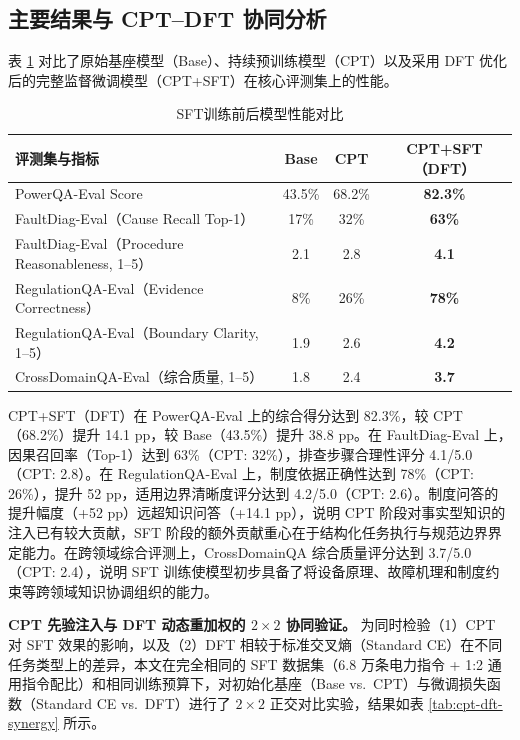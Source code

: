 \documentclass[fontset=fandol,type=master,campus=shenzhen,etitleauto=true]{hithesisbook}
\begin{document}
\subsection{主要结果与 CPT--DFT 协同分析}\label{ux4e3bux8981ux7ed3ux679c-2}

表 \ref{tab:sft-results} 对比了原始基座模型（Base）、持续预训练模型（CPT）以及采用 DFT 优化后的完整监督微调模型（CPT+SFT）在核心评测集上的性能。

\begin{table}[htbp]
\centering
\caption{SFT训练前后模型性能对比}
\label{tab:sft-results}
\small
\begin{tabular}{l c c c}
\toprule
\textbf{评测集与指标} & \textbf{Base} & \textbf{CPT} & \textbf{CPT+SFT（DFT）} \\
\midrule
PowerQA-Eval Score & 43.5\% & 68.2\% & \textbf{82.3\%} \\
FaultDiag-Eval（Cause Recall Top-1） & 17\% & 32\% & \textbf{63\%} \\
FaultDiag-Eval（Procedure Reasonableness, 1--5） & 2.1 & 2.8 & \textbf{4.1} \\
RegulationQA-Eval（Evidence Correctness） & 8\% & 26\% & \textbf{78\%} \\
RegulationQA-Eval（Boundary Clarity, 1--5） & 1.9 & 2.6 & \textbf{4.2} \\
CrossDomainQA-Eval（综合质量, 1--5） & 1.8 & 2.4 & \textbf{3.7} \\
\bottomrule
\end{tabular}
\end{table}

CPT+SFT（DFT）在 PowerQA-Eval 上的综合得分达到 82.3\%，较 CPT（68.2\%）提升 14.1 pp，较 Base（43.5\%）提升 38.8 pp。在 FaultDiag-Eval 上，因果召回率（Top-1）达到 63\%（CPT: 32\%），排查步骤合理性评分 4.1/5.0（CPT: 2.8）。在 RegulationQA-Eval 上，制度依据正确性达到 78\%（CPT: 26\%），提升 52 pp，适用边界清晰度评分达到 4.2/5.0（CPT: 2.6）。制度问答的提升幅度（+52 pp）远超知识问答（+14.1 pp），说明 CPT 阶段对事实型知识的注入已有较大贡献，SFT 阶段的额外贡献重心在于结构化任务执行与规范边界界定能力。在跨领域综合评测上，CrossDomainQA 综合质量评分达到 3.7/5.0（CPT: 2.4），说明 SFT 训练使模型初步具备了将设备原理、故障机理和制度约束等跨领域知识协调组织的能力。

\textbf{CPT 先验注入与 DFT 动态重加权的 $2 \times 2$ 协同验证。} 为同时检验（1）CPT 对 SFT 效果的影响，以及（2）DFT 相较于标准交叉熵（Standard CE）在不同任务类型上的差异，本文在完全相同的 SFT 数据集（6.8 万条电力指令 + 1:2 通用指令配比）和相同训练预算下，对初始化基座（Base vs.\ CPT）与微调损失函数（Standard CE vs.\ DFT）进行了 $2 \times 2$ 正交对比实验，结果如表 \ref{tab:cpt-dft-synergy} 所示。
\end{document}
